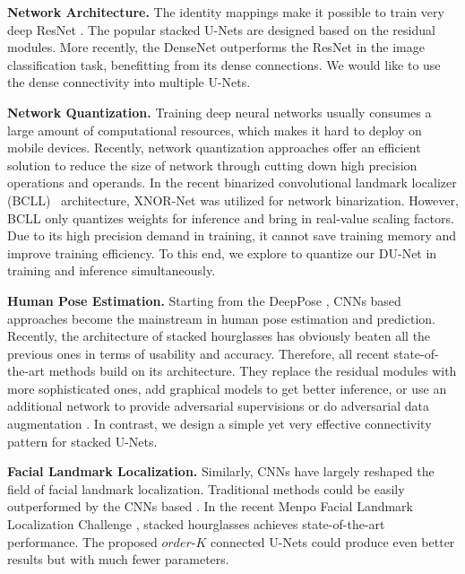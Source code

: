 \documentclass[runningheads]{llncs}
\begin{document}
{\bf Network Architecture.}
The identity mappings make it possible to train very deep ResNet \cite{he2016deep}. The popular stacked U-Nets \cite{newell2016stacked} are designed based on the residual modules. More recently, the DenseNet \cite{huang2016densely} outperforms the ResNet in the image classification task, benefitting from its dense connections. We would like to use the dense connectivity into multiple U-Nets.



{\bf Network Quantization.}
Training deep neural networks usually consumes a large amount of computational resources, which makes it hard to deploy on mobile devices. Recently, network quantization approaches \cite{courbariaux2016binarized,li2016ternary,zhou2016dorefa,wu2018training,rastegari2016xnor} offer an efficient solution to reduce the size of network through cutting down high precision operations and operands. In the recent binarized convolutional landmark localizer (BCLL)~\cite{bulat2017binarized} architecture, XNOR-Net \cite{rastegari2016xnor} was utilized for network binarization. However, BCLL only quantizes weights for inference and bring in real-value scaling factors. Due to its high precision demand in training, it cannot save training memory and improve training efficiency. To this end, we explore to quantize our DU-Net in training and inference simultaneously.

{\bf Human Pose Estimation.}
Starting from the DeepPose \cite{toshev2014deeppose}, CNNs based approaches \cite{wei2016convolutional,carreira2016human,bulat2016human,pishchulin2016deepcut,insafutdinov2016deepercut,lifshitz2016human,belagiannis2017recurrent,zhao2018learning} become the mainstream in human pose estimation and prediction. Recently, the architecture of stacked hourglasses \cite{newell2016stacked} has obviously beaten all the previous ones in terms of usability and accuracy. Therefore, all recent state-of-the-art methods \cite{chu2017multi,yang2017learning,yu2017adversarial,peng2018jointly} build on its architecture. They replace the residual modules with more sophisticated ones, add graphical models to get better inference, or use an additional network to provide adversarial supervisions or do adversarial data augmentation \cite{peng2018jointly}. In contrast, we design a simple yet very effective connectivity pattern for stacked U-Nets.

{\bf Facial Landmark Localization.}
Similarly, CNNs have largely reshaped the field of facial landmark localization. Traditional methods could be easily outperformed by the CNNs based \cite{zhang2014coarse,zhang2014facial,lv2017deep,peng2016recurrent,peng2018red}. In the recent Menpo Facial Landmark Localization Challenge \cite{zafeiriou2017menpo}, stacked hourglasses \cite{newell2016stacked} achieves state-of-the-art performance. The proposed $order$-$K$ connected U-Nets could produce even better results but with much fewer parameters.
\end{document}
